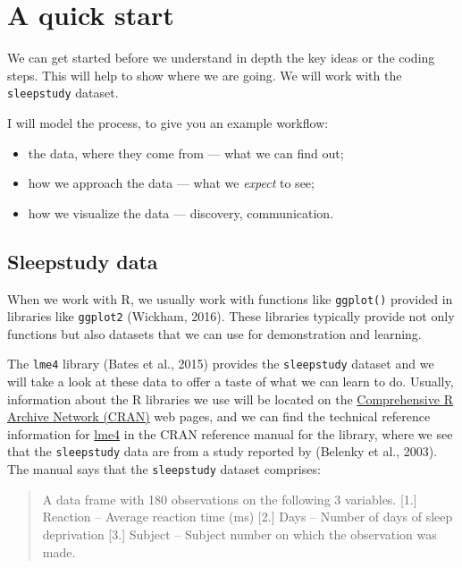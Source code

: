 \documentclass[
  letterpaper,
  DIV=11,
  numbers=noendperiod]{scrreprt}
\providecommand{\tightlist}{%
  \setlength{\itemsep}{0pt}\setlength{\parskip}{0pt}}\usepackage{longtable,booktabs,array}
\begin{document}
\hypertarget{sec-quick-start}{%
\section{A quick start}\label{sec-quick-start}}

We can get started before we understand in depth the key ideas or the
coding steps. This will help to show where we are going. We will work
with the \texttt{sleepstudy} dataset.

I will model the process, to give you an example workflow:

\begin{itemize}
\tightlist
\item
  the data, where they come from --- what we can find out;
\item
  how we approach the data --- what we \emph{expect} to see;
\item
  how we visualize the data --- discovery, communication.
\end{itemize}

\hypertarget{sec-sleep-study-data}{%
\subsection{Sleepstudy data}\label{sec-sleep-study-data}}

When we work with R, we usually work with functions like
\texttt{ggplot()} provided in libraries like \texttt{ggplot2} (Wickham,
2016). These libraries typically provide not only functions but also
datasets that we can use for demonstration and learning.

The \texttt{lme4} library (Bates et al., 2015) provides the
\texttt{sleepstudy} dataset and we will take a look at these data to
offer a taste of what we can learn to do. Usually, information about the
R libraries we use will be located on the
\href{https://cran.r-project.org}{Comprehensive R Archive Network
(CRAN)} web pages, and we can find the technical reference information
for \href{https://cran.r-project.org/web/packages/lme4/lme4.pdf}{lme4}
in the CRAN reference manual for the library, where we see that the
\texttt{sleepstudy} data are from a study reported by (Belenky et al.,
2003). The manual says that the \texttt{sleepstudy} dataset comprises:

\begin{quote}
A data frame with 180 observations on the following 3 variables.
{[}1.{]} Reaction -- Average reaction time (ms) {[}2.{]} Days -- Number
of days of sleep deprivation {[}3.{]} Subject -- Subject number on which
the observation was made.
\end{quote}
\end{document}
